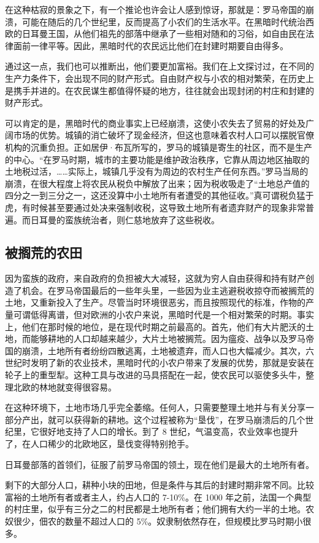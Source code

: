 在这种枯寂的景象之下，有一个推论也许会让人感到惊讶，那就是：罗马帝国的崩溃，可能在随后的几个世纪里，反而提高了小农们的生活水平。在黑暗时代统治西欧的日耳曼王国，从他们祖先的部落中继承了一些相对随和的习俗，如自由民在法律面前一律平等。因此，黑暗时代的农民远比他们在封建时期要自由得多。

通过这一点，我们也可以推断出，他们要更加富裕。我们在上文探讨过，在不同的生产力条件下，会出现不同的财产形式。自由财产权与小农的相对繁荣，在历史上是携手并进的。在农民谋生都值得怀疑的地方，往往就会出现封闭的村庄和封建的财产形式。

可以肯定的是，黑暗时代的商业事实上已经崩溃，这使小农失去了贸易的好处及广阔市场的优势。城镇的消亡破坏了现金经济，但这也意味着农村人口可以摆脱官僚机构的沉重负担。正如居伊·布瓦所写的，罗马的城镇是寄生的社区，而不是生产的中心。“在罗马时期，城市的主要功能是维护政治秩序，它靠从周边地区抽取的土地税过活，……实际上，城镇几乎没有为周边的农村生产任何东西。”罗马当局的崩溃，在很大程度上将农民从税负中解放了出来；因为税收吸走了“土地总产值的四分之一到三分之一，这还没算中小土地所有者遭受的其他征收。”真可谓税负猛于虎，有时候甚至要通过处决来强制收税，这导致土地所有者遗弃财产的现象非常普遍。而日耳曼的蛮族统治者，则仁慈地放弃了这些税收。

\subsection{被搁荒的农田}
因为蛮族的政府，来自政府的负担被大大减轻，这就为穷人自由获得和持有财产创造了机会。在罗马帝国最后的一些年头里，一些因为业主逃避税收掠夺而被搁荒的土地，又重新投入了生产。尽管当时环境很恶劣，而且按照现代的标准，作物的产量可谓低得离谱，但对欧洲的小农户来说，黑暗时代是一个相对繁荣的时期。事实上，他们在那时候的地位，是在现代时期之前最高的。首先，他们有大片肥沃的土地，而能够耕地的人口却越来越少，大片土地被搁荒。因为瘟疫、战争以及罗马帝国的崩溃，土地所有者纷纷四散逃离，土地被遗弃，而人口也大幅减少。其次，六世纪时发明了新的农业技术，黑暗时代的小农户带来了发展的优势，那就是安装在轮子上的重型犁。这种工具与改进的马具搭配在一起，使农民可以驱使多头牛，整理北欧的林地就变得很容易。

在这种环境下，土地市场几乎完全萎缩。任何人，只需要整理土地并与有关分享一部分产出，就可以获得新的耕地。这个过程被称为“垦伐”，在罗马崩溃后的几个世纪里，它很好地支持了人口的增长。到了 8 世纪，气温变高，农业效率也提升了，在人口稀少的北欧地区，垦伐变得特别抢手。

日耳曼部落的首领们，征服了前罗马帝国的领土，现在他们是最大的土地所有者。

剩下的大部分人口，耕种小块的田地，但是条件与其后的封建时期非常不同。比较富裕的土地所有者或者主人，约占人口的 7-10\%。在 1000 年之前，法国一个典型的村庄里，似乎有三分之二的村民都是土地所有者；他们拥有大约一半的土地。农奴很少，佃农的数量不超过人口的 5\%。奴隶制依然存在，但规模比罗马时期小很多。


